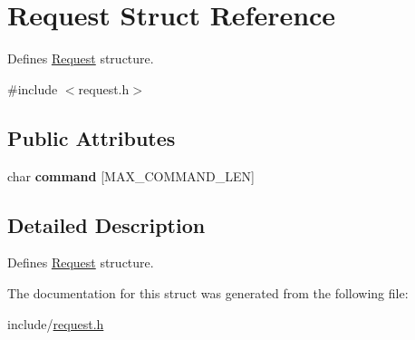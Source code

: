 \hypertarget{structRequest}{}\section{Request Struct Reference}
\label{structRequest}


Defines \hyperlink{structRequest}{Request} structure.  




{\ttfamily \#include $<$request.\+h$>$}

\subsection*{Public Attributes}
\begin{DoxyCompactItemize}
\item 
char {\bfseries command} \mbox{[}M\+A\+X\+\_\+\+C\+O\+M\+M\+A\+N\+D\+\_\+\+L\+EN\mbox{]}\hypertarget{structRequest_a3c36aa805e910a4573fe1af136667b48}{}\label{structRequest_a3c36aa805e910a4573fe1af136667b48}

\end{DoxyCompactItemize}


\subsection{Detailed Description}
Defines \hyperlink{structRequest}{Request} structure. 

The documentation for this struct was generated from the following file\+:\begin{DoxyCompactItemize}
\item 
include/\hyperlink{request_8h}{request.\+h}\end{DoxyCompactItemize}
